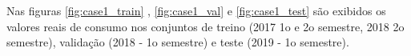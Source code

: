 \documentclass[	12pt, Times, openright, twoside, a4paper, english, brazil]{abntex2}
\begin{document}
                    Nas figuras \ref{fig:case1_train} , \ref{fig:case1_val} e \ref{fig:case1_test}   são exibidos os valores reais de consumo nos conjuntos de treino (2017 1o e 2o semestre, 2018 2o semestre), validação (2018 - 1o semestre) e teste (2019 - 1o semestre).
                    \begin{figure}[H]
                    \end{figure}
                    \begin{figure}[H]
                    \end{figure}
\end{document}
